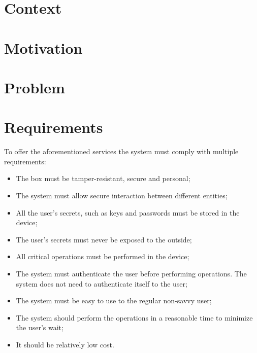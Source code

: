 \cleardoublepage
\label{chap:intro}


\section{Context} \label{chap:intro:context}

\section{Motivation} \label{chap:intro:motivation}

\section{Problem} \label{chap:intro:problem}

\section{Requirements} \label{chap:intro:requirements}

To offer the aforementioned services the system must comply with multiple requirements:
\begin{itemize}
	\item The box must be tamper-resistant, secure and personal;
	\item The system must allow secure interaction between different entities;
	\item All the user's secrets, such as keys and passwords must be stored in the device;
	\item The user's secrets must never be exposed to the outside;
	\item All critical operations must be performed in the device;
	\item The system must authenticate the user before performing operations. The system does not need to authenticate itself to the user;
	\item The system must be easy to use to the regular non-savvy user;
	\item The system should perform the operations in a reasonable time to minimize the user's wait;
	\item It should be relatively low cost.
\end{itemize}
